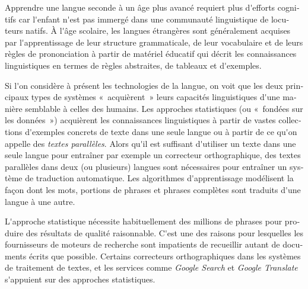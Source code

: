 \begin{french}
\begin{multicols}{2}
Apprendre une langue seconde à un âge plus avancé requiert plus
d{\mbox '}efforts cognitifs car l{\mbox '}enfant n{\mbox '}est pas
immergé dans une communauté linguistique de locuteurs natifs. À
l{\mbox '}âge scolaire, les langues étrangères sont généralement
acquises par l{\mbox '}apprentissage de leur structure grammaticale,
de leur vocabulaire et de leurs règles de prononciation à partir de
matériel éducatif qui décrit les connaissances linguistiques en termes
de règles abstraites, de tableaux et d{\mbox '}exemples.


Si l{\mbox '}on considère à présent les technologies de la langue, on
voit que les deux principaux types de systèmes «~acquièrent~» leurs
capacités linguistiques d{\mbox '}une manière semblable à celles des
humains. Les approches statistiques (ou «~fondées sur les données~»)
acquièrent les connaissances linguistiques à partir de vastes
collections d{\mbox '}exemples concrets de texte dans une seule langue
ou à partir de ce qu{\mbox '}on appelle des {\em textes
  parallèles}. Alors qu{\mbox '}il est suffisant d{\mbox '}utiliser un
texte dans une seule langue pour entraîner par exemple un correcteur
orthographique, des textes parallèles dans deux (ou plusieurs) langues
sont nécessaires pour entraîner un système de traduction
automatique. Les algorithmes d{\mbox '}apprentissage modélisent la
façon dont les mots, portions de phrases et phrases complètes sont
traduits d{\mbox '}une langue à une autre.

L{\mbox '}approche statistique nécessite habituellement des millions
de phrases pour produire des résultats de qualité raisonnable. C{\mbox
 '}est une des raisons pour lesquelles les fournisseurs de moteurs de
recherche sont impatients de recueillir autant de documents écrits que
possible. Certains correcteurs orthographiques dans les systèmes de
traitement de textes, et les services comme {\it Google Search} et
{\it Google Translate} s{\mbox '}appuient sur des approches
statistiques.


\end{multicols}
\end{french}
